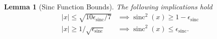 \documentclass{article}
\newtheorem{lemma}[theorem]{Lemma}
\DeclareMathOperator{\sinc}{sinc}
\begin{document}
\begin{lemma}[Sinc Function Bounds] \label{lem:sinc_poly_approx}
    The following implications hold 
    \begin{align}
        |x| \leq \sqrt{10 \epsilon_{\sinc}/7} &\implies \sinc^2(x) \geq 1 - \epsilon_{\sinc} \label{eq:sinc_lower_bound}\\
        |x| \geq 1 / \sqrt{\epsilon_{\sinc}} &\implies \sinc^2(x) \leq \epsilon_{\sinc}. \label{eq:sinc_upper_bound}
    \end{align}
\end{lemma}
\end{document}
